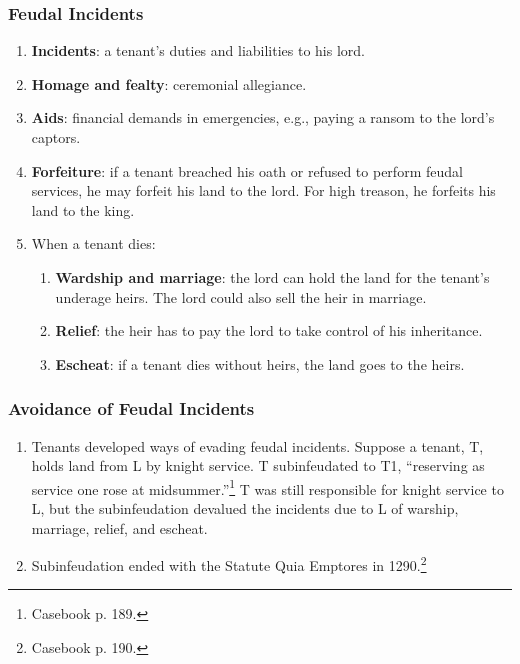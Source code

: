 \subsubsection{Feudal Incidents}

\begin{enumerate}
    \item \textbf{Incidents}: a tenant's duties and liabilities to his lord.
    \item \textbf{Homage and fealty}: ceremonial allegiance.
    \item \textbf{Aids}: financial demands in emergencies, e.g., paying a 
    ransom to the lord's captors.
    \item \textbf{Forfeiture}: if a tenant breached his oath or refused to 
    perform feudal services, he may forfeit his land to the lord. For high 
    treason, he forfeits his land to the king.
    \item When a tenant dies:
    \begin{enumerate}
        \item \textbf{Wardship and marriage}: the lord can 
        hold the land for the tenant's underage heirs. The lord could also 
        sell the heir in marriage.
        \item \textbf{Relief}: the heir has to pay the lord to take control of 
        his inheritance.
        \item \textbf{Escheat}: if a tenant dies without heirs, the land goes 
        to the heirs. 
    \end{enumerate}
\end{enumerate}

\subsubsection{Avoidance of Feudal Incidents}

\begin{enumerate}
    \item Tenants developed ways of evading feudal incidents. Suppose a 
    tenant, T, holds land from L by knight service. T subinfeudated to T1, 
    ``reserving as service one rose at midsummer.''\footnote{Casebook p. 189.} 
    T was still responsible for knight service to L, but the subinfeudation 
    devalued the incidents due to L of warship, marriage, relief, and 
    escheat.
    \item Subinfeudation ended with the Statute Quia Emptores in 
    1290.\footnote{Casebook p. 190.}
\end{enumerate}

